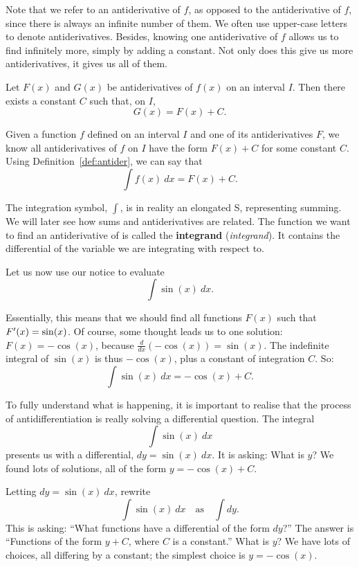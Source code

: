 Note that we refer to an antiderivative of $f$, as opposed to the antiderivative of $f$, since there is always an infinite number of them. We often use upper-case letters to denote antiderivatives. Besides, knowing one antiderivative of $f$ allows us to find infinitely more, simply by adding a constant. Not only does this give us more antiderivatives, it gives us all of them.

\begin{theorem}\label{thm:antideriv_const}
Let $F(x)$ and $G(x)$ be antiderivatives of $f(x)$ on an interval $I$. Then there exists a constant $C$ such that, on $I$,  $$G(x) = F(x) + C.$$
\end{theorem}

Given a function $f$ defined on an interval $I$ and one of its antiderivatives $F$, we know all antiderivatives of $f$ on $I$ have the form $F(x) + C$ for some constant $C$. Using Definition~\ref{def:antider}, we can say that 
$$\int f(x) \ dx = F(x) + C.$$

The integration symbol, $\int$, is in reality an elongated S, representing summing. We will later see how sums and antiderivatives are related. The function we want to find an antiderivative of is called the \textbf{integrand} (\textit{integrand}). It contains the differential of the variable we are integrating with respect to. 

Let us now use our notice to evaluate
$$\displaystyle \int \sin (x)\ dx.$$

Essentially, this means that we should find all functions $F(x)$ such that $F'(x) = \sin (x)$. Of course, some thought leads us to one solution: $F(x) = -\cos (x)$, because $\frac{d}{dx}(-\cos (x)) = \sin (x)$. The indefinite integral of $\sin (x)$ is thus $-\cos (x)$, plus a constant of integration $C$. So:
$$\int \sin (x) \ dx = -\cos (x) + C.$$

To fully understand what is happening, it is important to realise that the process of antidifferentiation is really solving a differential question. The integral $$\int \sin (x)\ dx$$ presents us with a differential, $dy = \sin (x)\ dx$. It is asking: What is $y$? We found lots of solutions, all of the form $y = -\cos (x)+C$.

Letting $dy = \sin (x)\ dx$,  rewrite 
$$\int \sin (x) \ dx \quad \text{as}\quad \int  dy.$$
This is asking: ``What functions have a differential of the form $dy$?'' The answer is ``Functions of the form $y+C$, where $C$ is a constant.'' What is $y$? We have lots of choices, all differing by a constant; the simplest choice is $y = -\cos (x)$.

